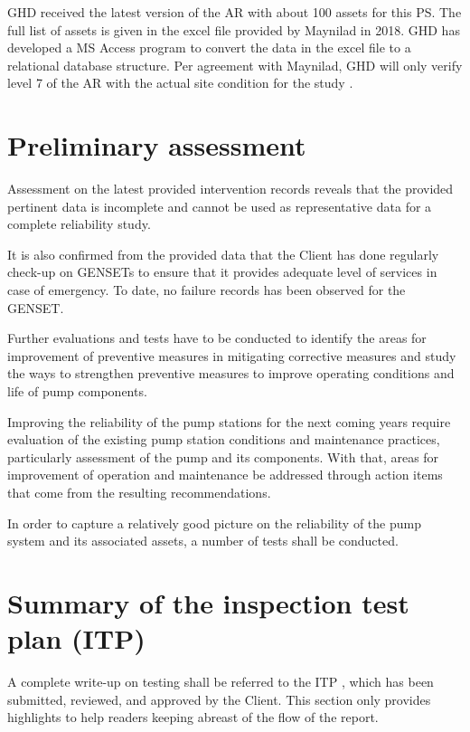 GHD received the latest version of the AR with about 100 assets for this PS. The full list of assets is given in the excel file provided by Maynilad in 2018. GHD has developed a MS Access program to convert the data in the excel file to a relational database structure. Per agreement with Maynilad, GHD will only verify level 7 of the AR with the actual site condition for the study \cite{GHD2018m}. 
\section{Preliminary assessment}
\label{22}
Assessment on the latest provided intervention records reveals that the provided pertinent data is incomplete and cannot be used as representative data for a complete reliability study. 

It is also confirmed from the provided data that the Client has done regularly check-up on GENSETs to ensure that it provides adequate level of services in case of emergency. To date, no failure records has been observed for the GENSET.

Further evaluations and tests have to be conducted to identify the areas for improvement of preventive measures in mitigating corrective measures and study the ways to strengthen preventive measures to improve operating conditions and life of pump components. 

Improving the reliability of the pump stations for the next coming years require evaluation of the existing pump station conditions and maintenance practices, particularly assessment of the pump and its components. With that, areas for improvement of operation and maintenance be addressed through action items that come from the resulting recommendations.

In order to capture a relatively good picture on the reliability of the pump system and its associated assets, a number of tests shall be conducted. 

\section{Summary of the inspection test plan (ITP)}
\label{231}
A complete write-up on testing shall be referred to the ITP \cite{GHD2018j}, which has been submitted, reviewed, and approved by the Client. This section only provides highlights to help readers keeping abreast  of the flow of the report.


%

